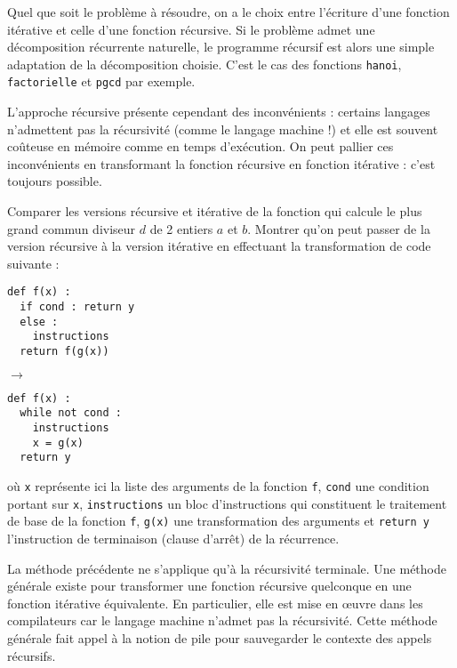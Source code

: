 Quel que soit le problème à résoudre, on a le choix entre l'écriture d'une fonction 
itérative et celle d'une fonction récursive. Si le problème admet une décomposition 
récurrente naturelle, le programme récursif est alors une simple adaptation de la 
décomposition choisie. C'est le cas des fonctions \texttt{hanoi}, \texttt{factorielle} et \texttt{pgcd} par exemple.

L'approche récursive présente cependant des inconvénients :
certains langages n'admettent pas la récursivité (comme le langage machine !)
et elle est souvent coûteuse en mémoire comme en temps d'exécution. 
On peut pallier ces inconvénients en transformant la fonction récursive 
en fonction itérative : c'est toujours possible.

\begin{question}
Comparer les versions récursive et itérative de la fonction qui calcule
le plus grand commun diviseur $d$ de 2 entiers $a$ et $b$.
Montrer qu'on peut passer de la version récursive à la version itérative
en effectuant la transformation de code suivante :
\vspace*{3mm}

\noindent\begin{minipage}{7cm}
\begin{lstlisting}
def f(x) :
  if cond : return y
  else : 
    instructions
  return f(g(x))
\end{lstlisting}
\end{minipage}
\hfill$\rightarrow$\hfill
\begin{minipage}{7cm}
\begin{lstlisting}
def f(x) :
  while not cond :
    instructions
    x = g(x)
  return y
\end{lstlisting}
\end{minipage}
\vspace*{3mm}

\noindent où \texttt{x} représente ici la liste des arguments de la fonction
\texttt{f},
\texttt{cond} une condition portant sur \texttt{x}, 
\texttt{instructions} un bloc d'instructions qui constituent
le traitement de base de la fonction \texttt{f}, 
\texttt{g(x)} une transformation des arguments et \texttt{return y}
l'instruction de terminaison (clause d'arrêt) de la récurrence.
\end{question}

La méthode précédente ne s'applique qu'à la récursivité terminale.
Une méthode générale existe pour transformer une fonction récursive
quelconque en une fonction itérative équivalente. En particulier,
elle est mise en \oe uvre dans les compilateurs car le langage machine 
n'admet pas la récursivité. Cette méthode générale fait appel à la notion 
de pile pour sauvegarder le contexte des appels récursifs. 

